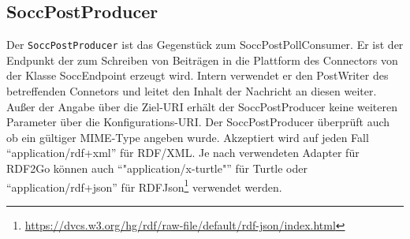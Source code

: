 
\subsection{SoccPostProducer} %
\label{sub:soccpostproducer}

Der \texttt{SoccPostProducer} ist das Gegenstück zum SoccPostPollConsumer. Er ist der Endpunkt der zum Schreiben von Beiträgen in die Plattform des Connectors von der Klasse SoccEndpoint erzeugt wird. Intern verwendet er den PostWriter des betreffenden Connetors und leitet den Inhalt der Nachricht an diesen weiter. Außer der Angabe über die Ziel-URI erhält der SoccPostProducer keine weiteren Parameter über die Konfigurations-URI. Der SoccPostProducer überprüft auch ob ein gültiger MIME-Type angeben wurde. Akzeptiert wird auf jeden Fall \enquote{application/rdf+xml} für RDF/XML. Je nach verwendeten Adapter für RDF2Go können auch \enquote{"application/x-turtle"} für Turtle oder \enquote{application/rdf+json} für RDFJson\footnote{\url{https://dvcs.w3.org/hg/rdf/raw-file/default/rdf-json/index.html}} verwendet werden.



